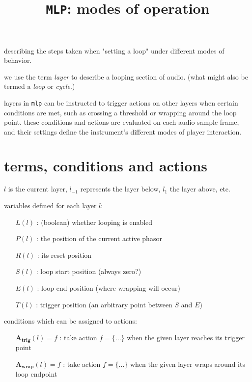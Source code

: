 \documentclass{article}
\begin{document}
\title{\texttt{MLP}: modes of operation}

\maketitle

describing the steps taken when "setting a loop" under different modes of behavior.

we use the term \textit{layer} to describe a looping section of audio. (what might also be termed a \textit{loop} or \textit{cycle}.)

layers in \texttt{mlp} can be instructed to trigger actions on other layers when certain conditions are met, such as crossing a threshold or wrapping around the loop point. these conditions and actions are evaluated on each audio sample frame, and their settings define the instrument's different modes of player interaction.


\section[terms]{terms, conditions and actions}

$l$ is the current layer, $l_{-1}$ represents the layer below, $l_{1}$ the layer above, etc.

variables defined for each layer $l$:

\begin{itemize}%
\item[$L(l)$]: (boolean) whether looping is enabled 
\item[$P(l)$]: the position of the current active phasor
\item[$R(l)$]: its reset position
\item[$S(l)$]: loop start position (always zero?)
\item[$E(l)$]: loop end position (where wrapping will occur)
\item[$T(l)$]: trigger position (an arbitrary point between $S$ and $E$)
\end{itemize}

conditions which can be assigned to actions:

\begin{itemize}%
\item[$\mathbf{A_{trig}}(l) = f$]: take action $f = \{...\}$ when the given layer reaches its trigger point
\item[$\mathbf{A_{wrap}}(l) = f$]: take action $f = \{...\}$ when the given layer wraps around its loop endpoint
\end{itemize}
\end{document}
